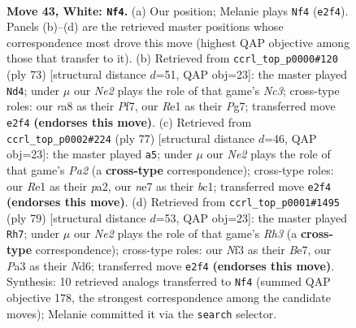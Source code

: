\documentclass[11pt]{article}
\begin{document}
\clearpage

\begin{figure}[p]\centering
\begin{subfigure}{0.46\textwidth}\centering
\resizebox{\linewidth}{!}{%
\newchessgame
\chessboard[
  setfen={r6k/4n3/8/pp4P1/b1p5/P1P1bN2/1B2N1K1/4R3 w - - 1 43},
  showmover=false,
  pgfstyle=straightmove, color=movearrow, markmove={e2-f4}
]}
\caption{}
\end{subfigure}\hfill
\begin{subfigure}{0.46\textwidth}\centering
\resizebox{\linewidth}{!}{%
\newchessgame
\chessboard[
  setfen={6k1/5ppp/b1n5/4p3/4P3/2BnNPP1/7P/3B2K1 b - - 0 37},
  showmover=false,
  pgfstyle=straightmove, color=movearrow, markmove={c6-d4}
]}
\caption{}
\end{subfigure}
\\[4pt]
\begin{subfigure}{0.46\textwidth}\centering
\resizebox{\linewidth}{!}{%
\newchessgame
\chessboard[
  setfen={8/p3k3/1b2p3/4Pp1p/3n1P1P/3B4/P5K1/2B5 b - - 0 39},
  showmover=false,
  pgfstyle=straightmove, color=movearrow, markmove={a7-a5}
]}
\caption{}
\end{subfigure}\hfill
\begin{subfigure}{0.46\textwidth}\centering
\resizebox{\linewidth}{!}{%
\newchessgame
\chessboard[
  setfen={8/1pk1b3/3npp1r/1p6/1P1B4/P2P1B2/4KP2/6R1 b - - 17 40},
  showmover=false,
  pgfstyle=straightmove, color=movearrow, markmove={h6-h7}
]}
\caption{}
\end{subfigure}
\caption{\textbf{Move 43, White: \texttt{Nf4}.} (a) Our position; Melanie plays \texttt{Nf4} (\texttt{e2f4}). Panels (b)--(d) are the retrieved master positions whose correspondence most drove this move (highest QAP objective among those that transfer to it). (b) Retrieved from \texttt{ccrl\_top\_p0000\#120} (ply 73) [structural distance $d$=51, QAP obj=23]: the master played \texttt{Nd4}; under $\mu$ our \emph{Ne2} plays the role of that game's \emph{Nc3}; cross-type roles: our \emph{r}a8 as their \emph{P}f7, our \emph{R}e1 as their \emph{P}g7; transferred move \texttt{e2f4} \textbf{(endorses this move)}. (c) Retrieved from \texttt{ccrl\_top\_p0002\#224} (ply 77) [structural distance $d$=46, QAP obj=23]: the master played \texttt{a5}; under $\mu$ our \emph{Ne2} plays the role of that game's \emph{Pa2} (a \textbf{cross-type} correspondence); cross-type roles: our \emph{R}e1 as their \emph{p}a2, our \emph{n}e7 as their \emph{b}c1; transferred move \texttt{e2f4} \textbf{(endorses this move)}. (d) Retrieved from \texttt{ccrl\_top\_p0001\#1495} (ply 79) [structural distance $d$=53, QAP obj=23]: the master played \texttt{Rh7}; under $\mu$ our \emph{Ne2} plays the role of that game's \emph{Rh3} (a \textbf{cross-type} correspondence); cross-type roles: our \emph{N}f3 as their \emph{B}e7, our \emph{P}a3 as their \emph{N}d6; transferred move \texttt{e2f4} \textbf{(endorses this move)}. Synthesis: 10 retrieved analogs transferred to \texttt{Nf4} (summed QAP objective 178, the strongest correspondence among the candidate moves); Melanie committed it via the \texttt{search} selector.}
\label{fig:thought-m84}
\end{figure}
\end{document}
